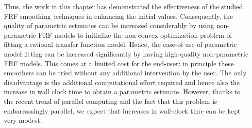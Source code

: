 Thus, the work in this chapter has demonstrated the effectiveness of the studied \gls{FRF} smoothing techniques in enhancing the initial values.
Consequently, the quality of parametric estimates can be increased considerably by using non-parametric \gls{FRF} models to initialize the non-convex optimization problem of fitting a rational transfer function model.
Hence, the ease-of-use of parametric model fitting can be increased significantly by having high-quality non-parametric \gls{FRF} models.
This comes at a limited cost for the end-user: in principle these smoothers can be tried without any additional intervention by the user.
The only disadvantage is the additional computational effort required and hence also the increase in wall clock time to obtain a parametric estimate.
However, thanks to the recent trend of parallel computing and the fact that this problem is embarrassingly parallel, we expect that increases in wall-clock time can be kept very modest.


%

%

